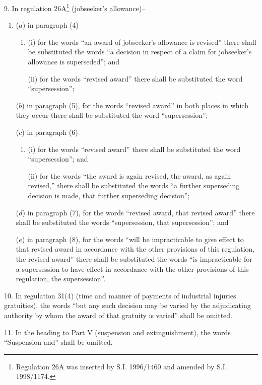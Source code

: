 \documentclass[12pt,a4paper]{article}
\begin{document}
9.  In regulation 26A\footnote{\frenchspacing Regulation 26A was inserted by S.I. 1996/1460 and amended by S.I. 1998/1174.} (jobseeker’s allowance)–
\begin{enumerate}\item[]
($a$) in paragraph (4)–
\begin{enumerate}\item[]
(i) for the words “an award of jobseeker’s allowance is revised” there shall be substituted the words “a decision in respect of a claim for jobseeker’s allowance is superseded”; and

(ii) for the words “revised award” there shall be substituted the word “supersession”;
\end{enumerate}

($b$) in paragraph (5), for the words “revised award” in both places in which they occur there shall be substituted the word “supersession”;

($c$) in paragraph (6)–
\begin{enumerate}\item[]
(i) for the words “revised award” there shall be substituted the word “supersession”; and

(ii) for the words “the award is again revised, the award, as again revised,” there shall be substituted the words “a further superseding decision is made, that further superseding decision”;
\end{enumerate}

($d$) in paragraph (7), for the words “revised award, that revised award” there shall be substituted the words “supersession, that supersession”; and

($e$) in paragraph (8), for the words “will be impracticable to give effect to that revised award in accordance with the other provisions of this regulation, the revised award” there shall be substituted the words “is impracticable for a supersession to have effect in accordance with the other provisions of this regulation, the supersession”.
\end{enumerate}

\medskip

10.  In regulation 31(4) (time and manner of payments of industrial injuries gratuities), the words “but any such decision may be varied by the adjudicating authority by whom the award of that gratuity is varied” shall be omitted.

\medskip

11.  In the heading to Part V (suspension and extinguishment), the words “Suspension and” shall be omitted.
\end{document}
